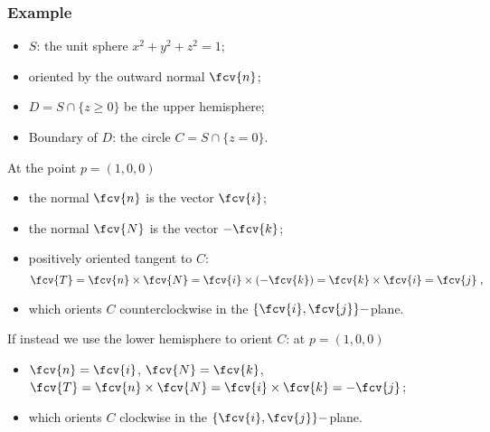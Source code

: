 \begin{frame}
  \frametitle{Example}

\begin{itemize}
  \item $S$: the unit sphere $x^2+y^2+z^2 = 1$;
  \item oriented by the outward normal $\fcv{n}$;
  \item $D = S \cap \{z\geqslant 0\}$ be the upper hemisphere;
  \item Boundary of $D$: the circle $C= S \cap \{z=0\}$.
\end{itemize}

\pause At the point $p=(1,0,0)$
\begin{itemize}
  \item the normal $\fcv{n}$ is the vector \pause $\fcv{i}$;
  \item the normal $\fcv{N}$ is the vector \pause $-\fcv{k}$;
  \item positively oriented tangent to $C$:\pause
%
$$\fcv{T}= \fcv{n} \times \fcv{N} = \fcv{i} \times (-\fcv{k}) = \fcv{k}\times \fcv{i} = \fcv{j} \;,$$
%
\item \pause which orients $C$ counterclockwise in the $\{\fcv{i},\fcv{j}\}-$plane.
\end{itemize}

\pause If instead we use the lower hemisphere to orient $C$: at $p=(1,0,0)$
 \begin{itemize}
   \item $\fcv{n}=\fcv{i}$, $\fcv{N}=\fcv{k}$, $\fcv{T}=\fcv{n}\times \fcv{N} = \fcv{i} \times \fcv{k} = -\fcv{j}$;
   \item which orients $C$ clockwise in the $\{\fcv{i},\fcv{j}\}-$plane.
 \end{itemize}
\end{frame}